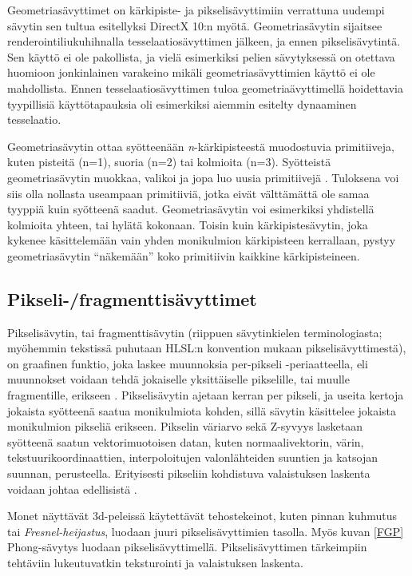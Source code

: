 \documentclass[finnish]{tktltiki2}
\theoremstyle{definition}
\theoremstyle{remark}
\begin{document}
Geometriasävyttimet on kärkipiste- ja pikselisävyttimiin verrattuna uudempi sävytin sen tultua esitellyksi DirectX 10:n myötä. Geometriasävytin sijaitsee renderointiliukuhihnalla tesselaatiosävyttimen jälkeen, ja ennen pikselisävytintä. Sen käyttö ei ole pakollista, ja vielä esimerkiksi pelien sävytyksessä on otettava huomioon jonkinlainen varakeino mikäli geometriasävyttimien käyttö ei ole mahdollista. Ennen tesselaatiosävyttimen tuloa geometriaävyttimellä hoidettavia tyypillisiä käyttötapauksia oli esimerkiksi aiemmin esitelty dynaaminen tesselaatio.

Geometriasävytin ottaa syötteenään \emph{n}-kärkipisteestä muodostuvia primitiiveja, kuten pisteitä (n=1), suoria (n=2) tai kolmioita (n=3). Syötteistä geometriasävytin muokkaa, valikoi ja jopa luo uusia primitiivejä \cite{Gre14}. Tuloksena voi siis olla nollasta useampaan primitiiviä, jotka eivät välttämättä ole samaa tyyppiä kuin syötteenä saadut. Geometriasävytin voi esimerkiksi yhdistellä kolmioita yhteen, tai hylätä kokonaan. Toisin kuin kärkipistesävytin, joka kykenee käsittelemään vain yhden monikulmion kärkipisteen kerrallaan, pystyy geometriasävytin ``näkemään'' koko primitiivin kaikkine kärkipisteineen.

\subsection{Pikseli-/fragmenttisävyttimet}

Pikselisävytin, tai fragmenttisävytin (riippuen sävytinkielen terminologiasta; myöhemmin tekstissä puhutaan HLSL:n konvention mukaan pikselisävyttimestä), on graafinen funktio, joka laskee muunnoksia per-pikseli -periaatteella, eli muunnokset voidaan tehdä jokaiselle yksittäiselle pikselille, tai muulle fragmentille, erikseen \cite{}. Pikselisävytin ajetaan kerran per pikseli, ja useita kertoja jokaista syötteenä saatua monikulmiota kohden, sillä sävytin käsittelee jokaista monikulmion pikseliä erikseen. Pikselin väriarvo sekä Z-syvyys lasketaan syötteenä saatun vektorimuotoisen datan, kuten normaalivektorin, värin, tekstuurikoordinaattien, interpoloitujen valonlähteiden suuntien ja katsojan suunnan, perusteella. Erityisesti pikseliin kohdistuva valaistuksen laskenta voidaan johtaa edellisistä \cite{Puh08}.

Monet näyttävät 3d-peleissä käytettävät tehostekeinot, kuten pinnan kuhmutus tai \emph{Fresnel-heijastus}, luodaan juuri pikselisävyttimien tasolla. Myös kuvan \ref{FGP} Phong-sävytys luodaan pikselisävyttimellä. Pikselisävyttimen tärkeimpiin tehtäviin lukeutuvatkin teksturointi ja valaistuksen laskenta.
\end{document}
